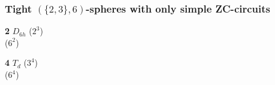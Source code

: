 \documentclass{beamer}
\begin{document}
\begin{frame}\frametitle{Tight $(\{2,3\},6)$-spheres with only simple
ZC-circuits}\vspace{-3mm}
\begin{center}
\vspace{-2.3mm}
\begin{minipage}[b]{25mm}\centering
{}\par
{\bf 2} $D_{6h}$ ($2^3$)\\($6^2$) \end{minipage}
\begin{minipage}[b]{21mm}\centering
{}\par
{\bf 4} $T_{d}$ ($3^4$)\\($6^4$)\end{minipage}
\begin{minipage}[b]{22mm}\centering

\end{minipage}
\end{center}
\end{frame}
\end{document}
